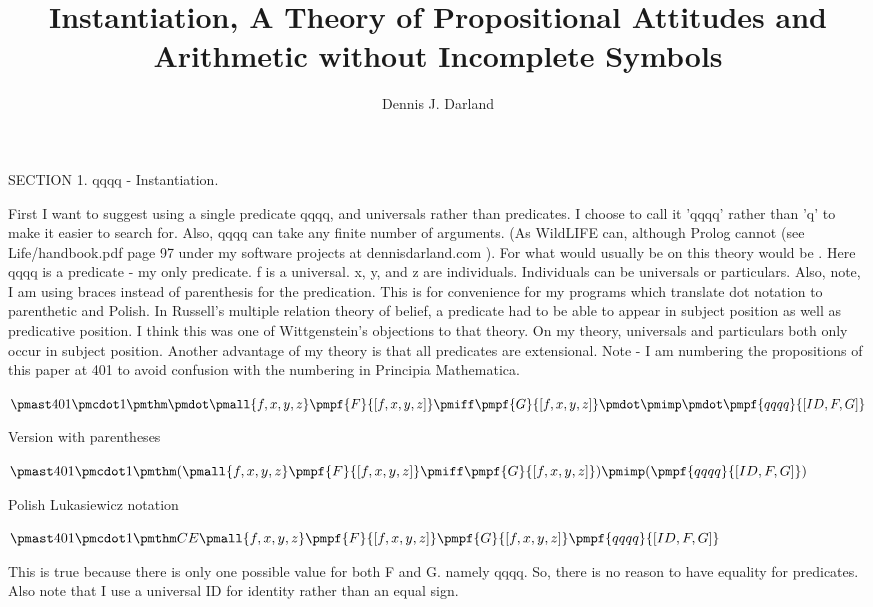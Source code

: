 \documentclass[12pt]{article}
\begin{document}
\title{Instantiation, A Theory of Propositional Attitudes and Arithmetic without Incomplete Symbols}
\author{Dennis J. Darland}
\maketitle

SECTION 1. qqqq - Instantiation.

First I want to suggest using a single predicate qqqq, and universals rather than predicates. I choose to call it 'qqqq' rather than 'q' to make it easier to
search for. Also, qqqq can take any finite number of arguments. (As WildLIFE can, although Prolog cannot (see Life/handbook.pdf page 97 under my software projects at dennisdarland.com ). For what would usually be  on this theory would be  . Here qqqq is a predicate - my only predicate. f is a universal. x, y, and z are individuals. Individuals can be universals or particulars. Also, note, I am using braces instead of parenthesis for the predication. This is for convenience for my programs which translate dot notation to parenthetic and Polish. In Russell's multiple relation theory of belief, a predicate had to be able to appear in subject position as well as predicative position. I think this was one of Wittgenstein's objections to that theory. On my theory, universals and particulars both only occur in subject position. Another advantage of my theory is that all predicates are extensional. Note - I am numbering the propositions of this paper at 401 to avoid confusion with the numbering in Principia Mathematica.

$\pmast 401 \pmcdot 1 \pmthm \pmdot \pmall{f, x, y, z} \pmpf{F}{[f,x,y,z]} \pmiff \pmpf{G}{[f,x,y,z]} \pmdot \pmimp \pmdot \pmpf{qqqq}{[ID,F,G]} $
 
 

Version with parentheses

$\pmast 401 \pmcdot 1 \pmthm  (  \pmall{f, x, y, z} \pmpf{F}{[f,x,y,z]} \pmiff \pmpf{G}{[f,x,y,z]}  ) \pmimp (  \pmpf{qqqq}{[ID,F,G]} )$


Polish Lukasiewicz notation

$\pmast 401 \pmcdot 1 \pmthm  C    E   \pmall{f,   x,   y,   z}   \pmpf{F}{[f,x,y,z]}   \pmpf{G}{[f,x,y,z]}    \pmpf{qqqq}{[ID,F,G]}  $


This is true because there is only one possible value for both F and G. namely qqqq. So, there is no reason to have equality for predicates. Also note that I use a universal ID for identity rather than an equal sign.
\end{document}
